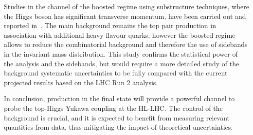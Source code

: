 Studies in the channel of the boosted regime using substructure
techniques, where the Higgs boson has significant transverse momentum, 
have been carried out and reported in~\cite{Costa:2018fdy}. The main background remains the top pair 
production in association with additional heavy flavour quarks, however the boosted 
regime allows to reduce the combinatorial background and therefore the use of 
sidebands in the invariant mass distribution. This study confirms the statistical power 
of the analysis and the sidebands, but would require a more detailed study of the 
background systematic uncertainties to be fully compared with the current projected 
results based on the LHC Run 2 analysis.

In conclusion, \ttH production in the \Htobb final state will provide a powerful channel to probe the top-Higgs Yukawa coupling at the HL-LHC.
The control of the \ttHF background is crucial, and it is expected to benefit from measuring relevant quantities from data, thus mitigating the impact of theoretical uncertainties.



